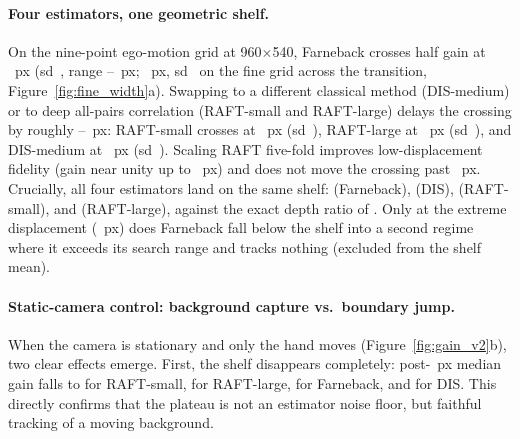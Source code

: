 \documentclass[11pt]{article}
\begin{document}
\paragraph{Four estimators, one geometric shelf.}
On the nine-point ego-motion grid at 960$\times$540, Farneback crosses half gain at
\cgWidthHalfB{}~px (sd~\cgWidthHalfSdB{}, range \cgHalfFarMin{}--\cgHalfFarMax{}~px;
\cgHalfFineMean{}~px, sd~\cgHalfFineSd{} on the fine grid across the transition,
Figure~\ref{fig:fine_width}a). Swapping to a different classical method (DIS-medium) or to deep
all-pairs correlation (RAFT-small and RAFT-large) delays the crossing by roughly
\cgDelayMinPx{}--\cgDelayMaxPx{}~px: RAFT-small crosses at \cgHalfRaftMean{}~px
(sd~\cgHalfRaftSd{}), RAFT-large at \cgHalfRaftLargeMean{}~px (sd~\cgHalfRaftLargeSd{}), and
DIS-medium at \cgHalfDisMean{}~px (sd~\cgHalfDisSd{}). Scaling RAFT five-fold improves
low-displacement fidelity (gain near unity up to \cgDispKnee{}~px) and does not move the crossing
past \cgHalfRaftMean{}~px. Crucially, all four estimators land on the same shelf: \cgShelfMean{}
(Farneback), \cgShelfDisMean{} (DIS), \cgShelfRaftMean{} (RAFT-small), and \cgShelfRaftLargeMean{}
(RAFT-large), against the exact depth ratio of \cgRatio{}. Only at the extreme displacement
(\cgDispMax{}~px) does Farneback fall below the shelf into a second regime where it exceeds its
search range and tracks nothing (excluded from the shelf mean).

\begin{table}[t]
\centering\small
\resizebox{\linewidth}{!}{}
\caption{Four-estimator comparison at 960$\times$540 (mean $\pm$ sd across seeds). Ego-motion
crossings $d_{0.5}$ and shelf gains are on the nine-point grid (Farneback fine-grid $d_{0.5}$ is
\cgHalfFineMean{} $\pm$ \cgHalfFineSd{}~px). Static-camera post-\cgDispShelfProbe{}~px gain is the
median over \cgDispShelfProbe{}--\cgDispMax{}~px. A14 rotation residual is for 1~deg yaw
(\cgNSeedsRaft{} seeds) against exact geometry (\cgAOneFourGeom{}~px).}
\label{tab:estimators}
\end{table}

\paragraph{Static-camera control: background capture vs.\ boundary jump.}
When the camera is stationary and only the hand moves (Figure~\ref{fig:gain_v2}b), two clear
effects emerge. First, the \cgRatio{} shelf disappears completely: post-\cgDispShelfProbe{}~px
median gain falls to \cgStaticFloorRaftS{} for RAFT-small, \cgStaticFloorRaftL{} for RAFT-large,
\cgStaticFloorFar{} for Farneback, and \cgStaticFloorDis{} for DIS. This directly confirms that the
\cgRatio{} plateau is not an estimator noise floor, but faithful tracking of a moving background.
\end{document}
